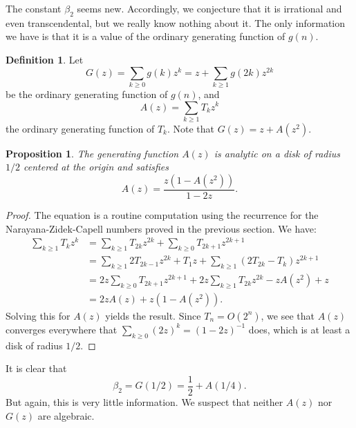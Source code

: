 \documentclass[12pt]{amsart}
\newtheorem{proposition}{Proposition}
\theoremstyle{definition}
\newtheorem{definition}{Definition}
\begin{document}
The constant $\beta_2$ seems new. Accordingly, we conjecture that it is
irrational and even transcendental, but we really know nothing about it. The
only information we have is that it is a value of the ordinary generating
function of $g(n)$.

\begin{definition}
    Let
    \begin{equation*}
        G(z) = \sum_{k \geq 0} g(k) z^k = z + \sum_{k \geq 1} g(2k) z^{2k}
    \end{equation*}
    be the ordinary generating function of $g(n)$, and
    \begin{equation*}
        A(z) = \sum_{k \geq 1} T_k z^k
    \end{equation*}
    the ordinary generating function of $T_k$. Note that $G(z) = z + A(z^2)$.
\end{definition}

\begin{proposition}
    The generating function $A(z)$ is analytic on a disk of radius $1 / 2$
    centered at the origin and satisfies
    \begin{equation*}
        A(z) = \frac{z(1 - A(z^2))}{1 - 2z}.
    \end{equation*}
\end{proposition}

\begin{proof}
    The equation is a routine computation using the recurrence for the Narayana-Zidek-Capell numbers proved in
    the previous section. We have:
    \begin{align*}
        \sum_{k \geq 1} T_k z^k
            &= \sum_{k \geq 1} T_{2k} z^{2k} + \sum_{k \geq 0} T_{2k+1} z^{2k + 1} \\
            &= \sum_{k \geq 1} 2 T_{2k-1} z^{2k} + T_1 z + \sum_{k \geq 1} (2T_{2k} - T_k) z^{2k + 1} \\
            &= 2 z \sum_{k \geq 0} T_{2k+1} z^{2k + 1} + 2 z \sum_{k \geq 1} T_{2k} z^{2k} - z A(z^2) + z \\
            &= 2z A(z) + z(1 - A(z^2)).
    \end{align*}
    Solving this for $A(z)$ yields the result. Since $T_n =
    O(2^n)$, we see that $A(z)$ converges everywhere that $\sum_{k \geq 0} (2z)^k = (1 -
    2z)^{-1}$ does, which is at least a disk of radius $1/2$.
\end{proof}

It is clear that
\begin{equation*}
    \beta_2 = G(1/2) =\frac{1}{2} + A(1/4).
\end{equation*}
But again, this is very little information. We suspect that neither $A(z)$ nor
$G(z)$ are algebraic.
\end{document}
